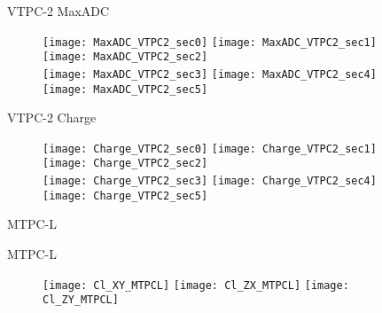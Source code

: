 \documentclass[11pt]{beamer}
\begin{document}
\begin{frame}{VTPC-2 MaxADC}
\begin{figure}
\centering
\texttt{[image: MaxADC\_VTPC2\_sec0]}
\texttt{[image: MaxADC\_VTPC2\_sec1]}
\texttt{[image: MaxADC\_VTPC2\_sec2]}\\
\texttt{[image: MaxADC\_VTPC2\_sec3]}
\texttt{[image: MaxADC\_VTPC2\_sec4]}
\texttt{[image: MaxADC\_VTPC2\_sec5]}
\end{figure}
\end{frame}

\begin{frame}{VTPC-2 Charge}
\begin{figure}
\centering
\texttt{[image: Charge\_VTPC2\_sec0]}
\texttt{[image: Charge\_VTPC2\_sec1]}
\texttt{[image: Charge\_VTPC2\_sec2]}\\
\texttt{[image: Charge\_VTPC2\_sec3]}
\texttt{[image: Charge\_VTPC2\_sec4]}
\texttt{[image: Charge\_VTPC2\_sec5]}
\end{figure}
\end{frame}

\begin{frame}
\centering
\Huge
MTPC-L
\end{frame}

\begin{frame}{MTPC-L}
\begin{figure}
\centering
\texttt{[image: Cl\_XY\_MTPCL]}
\texttt{[image: Cl\_ZX\_MTPCL]}
\texttt{[image: Cl\_ZY\_MTPCL]}
\end{figure}
\end{frame}
\end{document}
